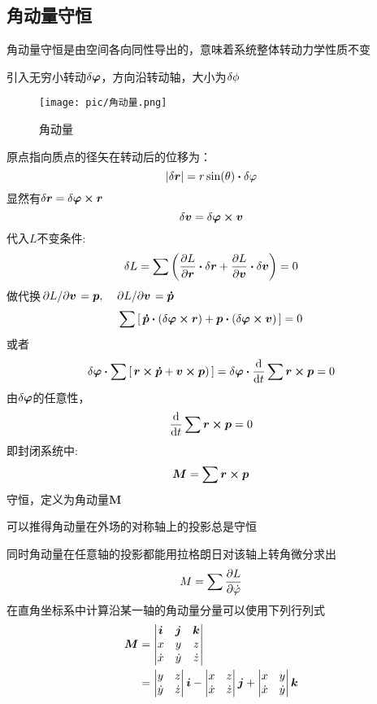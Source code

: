 \documentclass[12pt]{report}
\newcommand{\vecb}[1]{\boldsymbol{#1}}
\begin{document}
\subsection{角动量守恒}
角动量守恒是由空间各向同性导出的，意味着系统整体转动力学性质不变\par
引入无穷小转动$\var{\vecb{\varphi}}$，方向沿转动轴，大小为$\var{\phi}$

\begin{wrapfigure}{r}{3.5cm}
    \texttt{[image: pic/角动量.png]}
    \caption{角动量}
\end{wrapfigure}
原点指向质点的径矢在转动后的位移为：
$$\abs{\var{\vecb{r}}}=r\sin(\theta) \vdot \var{\varphi}$$
显然有$\var{\vecb{r}}=\var{\vecb{\varphi}} \cross \vecb{r}$
$$\var{\vecb{v}}=\var{\vecb{\varphi}} \cross \vecb{v}$$
代入$L$不变条件:
$$\var{L}=\sum \qty(\pdv{L}{\vecb{r}} \vdot \var{\vecb{r}}
 + \pdv{L}{\vecb{v}} \vdot \var{\vecb{v}})=0$$
做代换$\pdv*{L}{\vecb{v}}=\vecb{p},\quad \pdv*{L}{\vecb{v}}=\vecb{\dot{p}}$
$$\sum\qty[\,\vecb{\dot{p}}\vdot (\var{\vecb{\varphi}}\cross \vecb{r})+ \vecb{p}\vdot (\var{\vecb{\varphi}}\cross \vecb{v})\,]=0$$
或者
$$\var{\vecb{\varphi}}\vdot \sum\qty[\,\vecb{r}\cross \vecb{\dot{p}}+ \vecb{v}\cross \vecb{p})\,]
=\var{\vecb{\varphi}}\vdot \dv{t}\sum \vecb{r}\cross \vecb{p}=0$$
由$\var{\vecb{\varphi}}$的任意性， $$\dv{t}\sum \vecb{r}\cross \vecb{p}=0$$
即封闭系统中:
$$\vecb{M}=\sum \vecb{r}\cross \vecb{p}$$
守恒，定义为角动量$\vecb{M}$\par
可以推得角动量在外场的对称轴上的投影总是守恒\par
同时角动量在任意轴的投影都能用拉格朗日对该轴上转角微分求出
\begin{equation}
    M=\sum \pdv{L}{\dot{\varphi}}
    \label{角动量守恒}
\end{equation}
在直角坐标系中计算沿某一轴的角动量分量可以使用下列行列式
\begin{equation*}
    \begin{split}
    \vecb{M}&=\mdet{\vecb{i}&\vecb{j}&\vecb{k}\\x&y&z\\\dot{x}&\dot{y}&\dot{z}}\\
        &= \mdet{y&z\\\dot{y}&\dot{z}}\vecb{i}
        - \mdet{x&z\\\dot{x}&\dot{z}}\vecb{j}
        + \mdet{x&y\\\dot{x}&\dot{y}}\vecb{k}
    \end{split}
\end{equation*} %
\end{document}
